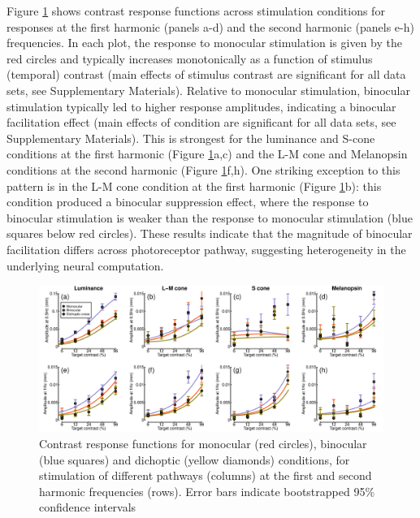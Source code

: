 \documentclass[
]{article}
\begin{document}
Figure \ref{fig:CRFplots} shows contrast response functions across stimulation conditions for responses at the first harmonic (panels a-d) and the second harmonic (panels e-h) frequencies. In each plot, the response to monocular stimulation is given by the red circles and typically increases monotonically as a function of stimulus (temporal) contrast (main effects of stimulus contrast are significant for all data sets, see Supplementary Materials). Relative to monocular stimulation, binocular stimulation typically led to higher response amplitudes, indicating a binocular facilitation effect (main effects of condition are significant for all data sets, see Supplementary Materials). This is strongest for the luminance and S-cone conditions at the first harmonic (Figure \ref{fig:CRFplots}a,c) and the L-M cone and Melanopsin conditions at the second harmonic (Figure \ref{fig:CRFplots}f,h). One striking exception to this pattern is in the L-M cone condition at the first harmonic (Figure \ref{fig:CRFplots}b): this condition produced a binocular suppression effect, where the response to binocular stimulation is weaker than the response to monocular stimulation (blue squares below red circles). These results indicate that the magnitude of binocular facilitation differs across photoreceptor pathway, suggesting heterogeneity in the underlying neural computation.

\begin{figure}

{\centering \includegraphics{Figures/CRFs} 

}

\caption{Contrast response functions for monocular (red circles), binocular (blue squares) and dichoptic (yellow diamonds) conditions, for stimulation of different pathways (columns) at the first and second harmonic frequencies (rows). Error bars indicate bootstrapped 95\% confidence intervals}\label{fig:CRFplots}
\end{figure}
\end{document}
